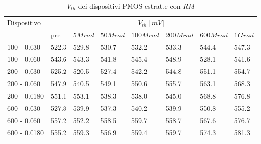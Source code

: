 \documentclass[12pt, letterpaper]{book}
\begin{document}
\begin{table}[H]
  \renewcommand{\arraystretch}{1.3}
  \begin{tabular}{m{2.1cm} m{0.8cm} m{1.1cm} m{1.3cm} m{1.5cm} m{1.5cm} m{1.5cm} m{1cm}}
    \toprule
    \multirow{2}{*}{Dispositivo} & \multicolumn{7}{c}{$V_{th} [mV] $}                                                                    \\
    \cmidrule{2-8}
                                 & pre                                & $5Mrad$ & $50Mrad$ & $100Mrad$ & $200Mrad$ & $600Mrad$ & $1Grad$ \\
    \midrule
    100 - 0.030                     & 522.3                              & 529.8   & 530.7    & 532.2     & 533.3     & 544.4     & 547.3   \\
    \hline
    100 - 0.060                     & 543.6                              & 543.3   & 541.8    & 545.4     & 548.9     & 528.1     & 541.6   \\
    \hline
    200 - 0.030                     & 525.2                              & 520.5   & 527.4    & 542.2     & 544.8     & 551.1     & 554.7   \\
    \hline
    200 - 0.060                     & 547.9                              & 540.5   & 549.1    & 550.6     & 555.7     & 563.1     & 568.3   \\
    \hline
    200 - 0.0180                    & 551.1                              & 553.1   & 538.3    & 538.0     & 545.0     & 568.8     & 576.8   \\
    \hline
    600 - 0.030                     & 527.8                              & 539.9   & 537.3    & 540.2     & 539.9     & 550.8     & 555.2   \\
    \hline
    600 - 0.060                     & 557.2                              & 552.2   & 558.5    & 559.7     & 558.7     & 567.6     & 576.7   \\
    \hline
    600 - 0.0180                    & 555.2                              & 559.3   & 556.9    & 559.4     & 559.7     & 574.3     & 581.3   \\
    \bottomrule
  \end{tabular}
  \caption{$V_{th}$ dei dispositivi PMOS estratte con \emph{RM}}
  \label{tab:VthRMP}
\end{table}
\end{document}
